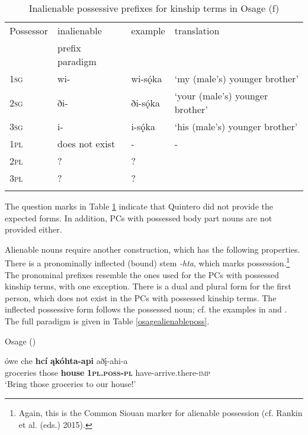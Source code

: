 \documentclass[output=paper]{LSP/langsci}
\begin{document}
\begin{table}
\caption{Inalienable possessive prefixes for kinship terms in Osage (\citealt[481]{Quintero2004}f)} \label{osageinalienable}
\begin{tabular}{ l l l l }
\lsptoprule
Possessor	 & inalienable & example & translation \\
& prefix paradigm & & \\
\midrule
\textsc{1sg} & wi-	& wi-sǫ́ka & `my (male's) younger brother' \\
 
\textsc{2sg} & ði- & ði-sǫ́ka & `your (male's) younger brother' \\
 
\textsc{3sg} & i- & i-sǫ́ka & `his (male's) younger brother' \\
 
\textsc{1pl} & does not exist &	- & - \\
 
\textsc{2pl} & ? & ? & \\
 
\textsc{3pl} & ? & ? & \\
\lspbottomrule
\end{tabular}
\end{table}
 
The question marks in Table \ref{osageinalienable} indicate that Quintero did not provide the expected forms. In addition, PCs with possessed body part nouns are not provided either.

Alienable nouns require another construction, which has the following properties. There is a pronominally inflected (bound) stem \textit{-hta}, which marks possession.\footnote{Again, this is the Common Siouan marker for alienable possession (cf. Rankin et al. (eds.) 2015).} The pronominal prefixes resemble the ones used for the PCs with possessed kinship terms, with one exception. There is a dual and plural form for the first person, which does not exist in the PCs with possessed kinship terms. The inflected possessive form follows the possessed noun; cf. the examples in  and . The full paradigm is given in Table \ref{osagealienableposs}.

\ea	Osage (\citealt[298]{Quintero2004}) \label{osagegroceries}

\gll ówe  che    \textbf{hc\'i} \textbf{ \k{a}kóhta-api}  aðį́-ahi-a \\
groceries  those \textbf{house} \textbf{\textsc{1pl.poss-pl}}   have-arrive.there-\textsc{imp} \\
\glt `Bring those groceries to our house!'
\end{document}
